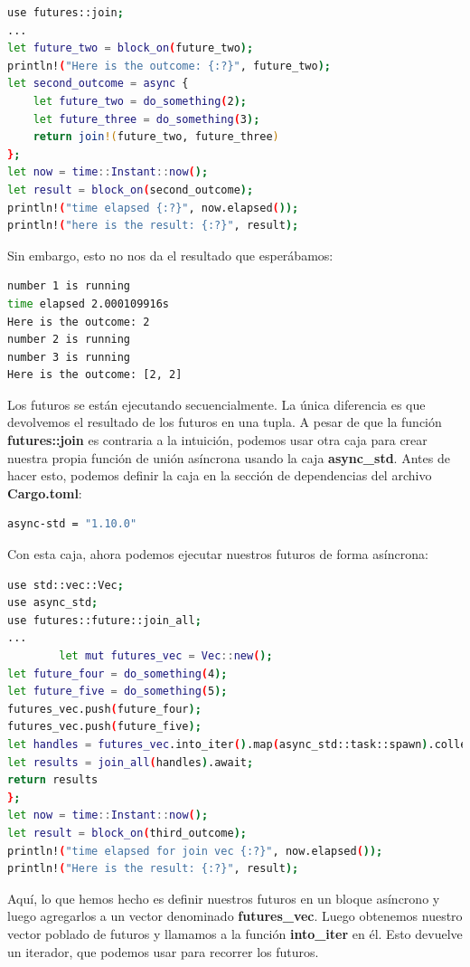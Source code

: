 \begin{lstlisting}[language=bash]
use futures::join;
...
let future_two = block_on(future_two);    
println!("Here is the outcome: {:?}", future_two);  
let second_outcome = async {
	let future_two = do_something(2);
	let future_three = do_something(3);
	return join!(future_two, future_three)
};    
let now = time::Instant::now();    
let result = block_on(second_outcome);    
println!("time elapsed {:?}", now.elapsed());    
println!("here is the result: {:?}", result);  
\end{lstlisting}

Sin embargo, esto no nos da el resultado que esperábamos:

\begin{lstlisting}[language=bash]
number 1 is running
time elapsed 2.000109916s
Here is the outcome: 2
number 2 is running
number 3 is running
Here is the outcome: [2, 2]
\end{lstlisting}

Los futuros se están ejecutando secuencialmente. La única diferencia es que devolvemos el resultado de los futuros en una tupla. A pesar de que la función \textbf{futures::join} es contraria a la intuición, podemos usar otra caja para crear nuestra propia función de unión asíncrona usando la caja \textbf{async\_std}. Antes de hacer esto, podemos definir la caja en la sección de dependencias del archivo \textbf{Cargo.toml}:

\begin{lstlisting}[language=bash]
async-std = "1.10.0"
\end{lstlisting}

Con esta caja, ahora podemos ejecutar nuestros futuros de forma asíncrona:

\begin{lstlisting}[language=bash]
use std::vec::Vec;
use async_std;
use futures::future::join_all;
...
        let mut futures_vec = Vec::new();
let future_four = do_something(4);
let future_five = do_something(5);
futures_vec.push(future_four);
futures_vec.push(future_five);
let handles = futures_vec.into_iter().map(async_std::task::spawn).collect::<Vec<_>>();
let results = join_all(handles).await;
return results    
};
let now = time::Instant::now();    
let result = block_on(third_outcome);    
println!("time elapsed for join vec {:?}", now.elapsed());    
println!("Here is the result: {:?}", result);
\end{lstlisting}

Aquí, lo que hemos hecho es definir nuestros futuros en un bloque asíncrono y luego agregarlos a un vector denominado \textbf{futures\_vec}. Luego obtenemos nuestro vector poblado de futuros y llamamos a la función \textbf{into\_iter} en él. Esto devuelve un iterador, que podemos usar para recorrer los futuros.

